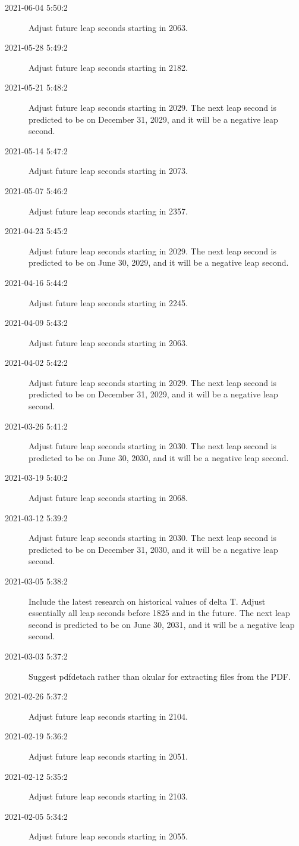\documentclass[letterpaper,twoside]{article}
\begin{document}
\begin{description}
\item[2021-06-04 5:50:2]Adjust future leap seconds starting in 2063.
\item[2021-05-28 5:49:2]Adjust future leap seconds starting in 2182.
\item[2021-05-21 5:48:2]Adjust future leap seconds starting in 2029.
  The next leap second is predicted to be on December 31, 2029, and
  it will be a negative leap second.
\item[2021-05-14 5:47:2]Adjust future leap seconds starting in 2073.
\item[2021-05-07 5:46:2]Adjust future leap seconds starting in 2357.
\item[2021-04-23 5:45:2]Adjust future leap seconds starting in 2029.
  The next leap second is predicted to be on June 30, 2029, and
  it will be a negative leap second.
\item[2021-04-16 5:44:2]Adjust future leap seconds starting in 2245.
\item[2021-04-09 5:43:2]Adjust future leap seconds starting in 2063.
\item[2021-04-02 5:42:2]Adjust future leap seconds starting in 2029.
  The next leap second is predicted to be on December 31, 2029, and
  it will be a negative leap second.
\item[2021-03-26 5:41:2]Adjust future leap seconds starting in 2030.
  The next leap second is predicted to be on June 30, 2030, and
  it will be a negative leap second.
\item[2021-03-19 5:40:2]Adjust future leap seconds starting in 2068.
\item[2021-03-12 5:39:2]Adjust future leap seconds starting in 2030.
  The next leap second is predicted to be on December 31, 2030,
  and it will be a negative leap second.
\item[2021-03-05 5:38:2]Include the latest research on historical values
  of delta T.  Adjust essentially all leap seconds before 1825 and
  in the future.  The next leap second is predicted to be on June 30, 2031,
  and it will be a negative leap second.
\item[2021-03-03 5:37:2]Suggest pdfdetach rather than okular
  for extracting files from the PDF.
\item[2021-02-26 5:37:2]Adjust future leap seconds starting in 2104.
\item[2021-02-19 5:36:2]Adjust future leap seconds starting in 2051.
\item[2021-02-12 5:35:2]Adjust future leap seconds starting in 2103.
\item[2021-02-05 5:34:2]Adjust future leap seconds starting in 2055.

\end{description}
\end{document}
